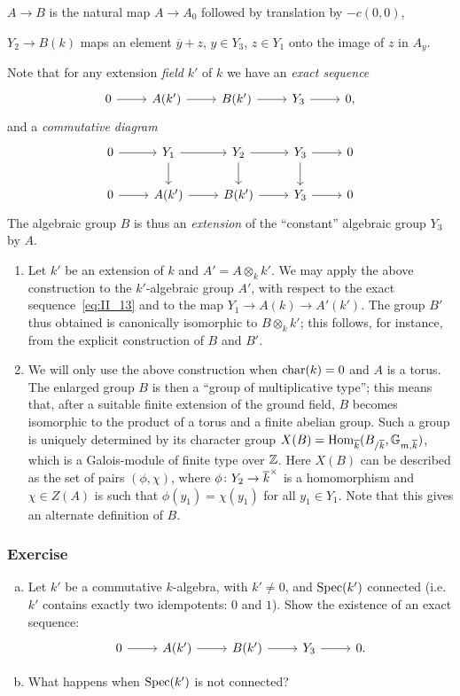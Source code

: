 $A \to B$ is the natural map $A \to A_0$ followed by translation by $- c(0,0)$,

$Y_2 \to B(k)$ maps an element $\overline{y} + z$, $y \in Y_3$, $z \in Y_1$ 
onto the image of $z$ in $A_y$.

Note that for any extension \emph{field} $k'$ of $k$ we have an \emph{exact 
sequence}
\[
	\begin{tikzcd}
		0 \arrow[r] & A(k') \arrow[r] & B(k') \arrow[r] & Y_3 \arrow[r] & 0,
	\end{tikzcd}
\]
and a \emph{commutative diagram}
\dpage
\[
	\begin{tikzcd}
		0 \arrow[r] & Y_1 \arrow[r] \arrow[d] & Y_2 \arrow[r] \arrow[d] & Y_3 
		\arrow[r] \arrow[d] & 0 \\
		0 \arrow[r] & A(k') \arrow[r] & B(k') \arrow[r] & Y_3 \arrow[r] & 0
	\end{tikzcd}
\]
The algebraic group $B$ is thus an \emph{extension} of the ``constant'' algebraic group $Y_3$ by $A$.
\begin{obs}
\begin{enumerate}
	\item Let $k'$ be an extension of $k$ and $A' = A \otimes_k k'$. We may 
	apply the above construction to the $k'$-algebraic group $A'$, with respect 
	to the exact sequence~\eqref{eq:II_13} and to the map $Y_1 \to A(k) \to
	A'(k') $. The group $B'$ thus obtained is canonically isomorphic to $B
	\otimes_k k'$; this follows, for instance, from the explicit construction
	of $B$ and $B'$.
	
	\item We will only use the above construction when $\operatorname{char}(k) = 0$ and $A$ 
	is a torus. The enlarged group $B$ is then a ``group of multiplicative 
	type''; this means that, after a suitable finite extension of the ground 
	field, $B$ becomes isomorphic to the product of a torus and a finite 
	abelian group. Such a group is uniquely determined by its character group $X
	(B) = \operatorname{Hom}_{\overline{k}} (B_{/\overline{k}}, \mathbb{G}_{m, \overline{k}})$, which is a 
	Galois-module of finite type over $\mathbb{Z}$. Here $X(B)$ can be described as the 
	set of pairs $(\phi, \chi)$, where $\phi \colon Y_2 \to
	{\overline{k}}^\times$ is a homomorphism and $\chi \in Z(A)$ is such that
	$\phi(y_1) = \chi(y_1)$ for all $y_1 \in Y_1$. Note that this gives an
	alternate definition of $B$. 
\end{enumerate}
\end{obs}

\subsubsection*{Exercise}
\begin{enumerate}[a)]
	\item Let $k'$ be a commutative $k$-algebra, with $k' \neq 0$, and $\operatorname{Spec}
	(k')$ connected (i.e.\ $k'$ contains exactly two idempotents: $0$ and $1$). 
	Show the existence of an exact sequence:
	\dpage
	\[\begin{tikzcd}
		0 \rar & A(k') \rar & B(k') \rar & Y_3 \rar & 0.
	\end{tikzcd}\]
	\item What happens when $\operatorname{Spec}(k')$ is not connected?
\end{enumerate}

